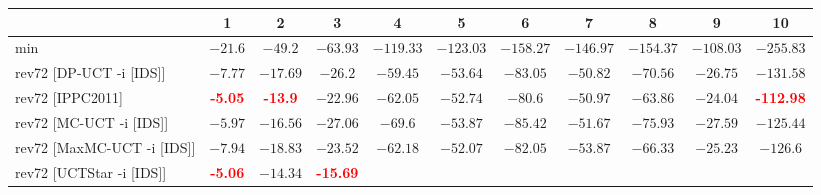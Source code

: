 \documentclass{article}
\begin{document}
\begin{tabular}{|l|r@{$\pm$}rr@{$\pm$}rr@{$\pm$}rr@{$\pm$}rr@{$\pm$}rr@{$\pm$}rr@{$\pm$}rr@{$\pm$}rr@{$\pm$}rr@{$\pm$}r|}
\hline

& \multicolumn{2}{c}{1}
& \multicolumn{2}{c}{2}
& \multicolumn{2}{c}{3}
& \multicolumn{2}{c}{4}
& \multicolumn{2}{c}{5}
& \multicolumn{2}{c}{6}
& \multicolumn{2}{c}{7}
& \multicolumn{2}{c}{8}
& \multicolumn{2}{c}{9}
& \multicolumn{2}{c|}{10}
\\
\hline
\hline
min
& \multicolumn{2}{c}{$-21.6$}
& \multicolumn{2}{c}{$-49.2$}
& \multicolumn{2}{c}{$-63.93$}
& \multicolumn{2}{c}{$-119.33$}
& \multicolumn{2}{c}{$-123.03$}
& \multicolumn{2}{c}{$-158.27$}
& \multicolumn{2}{c}{$-146.97$}
& \multicolumn{2}{c}{$-154.37$}
& \multicolumn{2}{c}{$-108.03$}
& \multicolumn{2}{c|}{$-255.83$}
\\
rev72 [DP-UCT -i [IDS]]
& \multicolumn{2}{c}{$-7.77$}
& \multicolumn{2}{c}{$-17.69$}
& \multicolumn{2}{c}{$-26.2$}
& \multicolumn{2}{c}{$-59.45$}
& \multicolumn{2}{c}{$-53.64$}
& \multicolumn{2}{c}{$-83.05$}
& \multicolumn{2}{c}{$-50.82$}
& \multicolumn{2}{c}{$-70.56$}
& \multicolumn{2}{c}{$-26.75$}
& \multicolumn{2}{c|}{$-131.58$}
\\
rev72 [IPPC2011]
& \multicolumn{2}{c}{\textbf{\textcolor{red}{-5.05}}}
& \multicolumn{2}{c}{\textbf{\textcolor{red}{-13.9}}}
& \multicolumn{2}{c}{$-22.96$}
& \multicolumn{2}{c}{$-62.05$}
& \multicolumn{2}{c}{$-52.74$}
& \multicolumn{2}{c}{$-80.6$}
& \multicolumn{2}{c}{$-50.97$}
& \multicolumn{2}{c}{$-63.86$}
& \multicolumn{2}{c}{$-24.04$}
& \multicolumn{2}{c|}{\textbf{\textcolor{red}{-112.98}}}
\\
rev72 [MC-UCT -i [IDS]]
& \multicolumn{2}{c}{$-5.97$}
& \multicolumn{2}{c}{$-16.56$}
& \multicolumn{2}{c}{$-27.06$}
& \multicolumn{2}{c}{$-69.6$}
& \multicolumn{2}{c}{$-53.87$}
& \multicolumn{2}{c}{$-85.42$}
& \multicolumn{2}{c}{$-51.67$}
& \multicolumn{2}{c}{$-75.93$}
& \multicolumn{2}{c}{$-27.59$}
& \multicolumn{2}{c|}{$-125.44$}
\\
rev72 [MaxMC-UCT -i [IDS]]
& \multicolumn{2}{c}{$-7.94$}
& \multicolumn{2}{c}{$-18.83$}
& \multicolumn{2}{c}{$-23.52$}
& \multicolumn{2}{c}{$-62.18$}
& \multicolumn{2}{c}{$-52.07$}
& \multicolumn{2}{c}{$-82.05$}
& \multicolumn{2}{c}{$-53.87$}
& \multicolumn{2}{c}{$-66.33$}
& \multicolumn{2}{c}{$-25.23$}
& \multicolumn{2}{c|}{$-126.6$}
\\
rev72 [UCTStar -i [IDS]]
& \multicolumn{2}{c}{\textbf{\textcolor{red}{-5.06}}}
& \multicolumn{2}{c}{$-14.34$}
& \multicolumn{2}{c}{\textbf{\textcolor{red}{-15.69}}}

\end{tabular}
\end{document}
